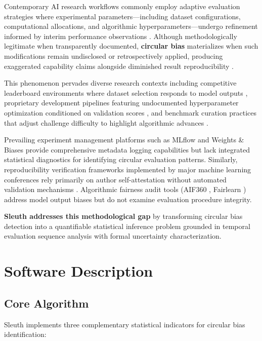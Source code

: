 \documentclass[10pt]{article}
\begin{document}
Contemporary AI research workflows commonly employ adaptive evaluation strategies where experimental parameters—including dataset configurations, computational allocations, and algorithmic hyperparameters—undergo refinement informed by interim performance observations \cite{dwork2015reusable,recht2019imagenet}. Although methodologically legitimate when transparently documented, \textbf{circular bias} materializes when such modifications remain undisclosed or retrospectively applied, producing exaggerated capability claims alongside diminished result reproducibility \cite{kapoor2023leakage,bouthillier2021accounting}.

This phenomenon pervades diverse research contexts including competitive leaderboard environments where dataset selection responds to model outputs \cite{blodgett2020language}, proprietary development pipelines featuring undocumented hyperparameter optimization conditioned on validation scores \cite{henderson2018deep}, and benchmark curation practices that adjust challenge difficulty to highlight algorithmic advances \cite{dehghani2021benchmark}.

Prevailing experiment management platforms such as MLflow \cite{zaharia2018mlflow} and Weights \& Biases \cite{biewald2020wandb} provide comprehensive metadata logging capabilities but lack integrated statistical diagnostics for identifying circular evaluation patterns. Similarly, reproducibility verification frameworks implemented by major machine learning conferences rely primarily on author self-attestation without automated validation mechanisms \cite{pineau2021improving}. Algorithmic fairness audit tools (AIF360 \cite{bellamy2019aif360}, Fairlearn \cite{bird2020fairlearn}) address model output biases but do not examine evaluation procedure integrity.

\textbf{Sleuth addresses this methodological gap} by transforming circular bias detection into a quantifiable statistical inference problem grounded in temporal evaluation sequence analysis with formal uncertainty characterization.

\section{Software Description}

\subsection{Core Algorithm}

Sleuth implements three complementary statistical indicators for circular bias identification:
\end{document}

